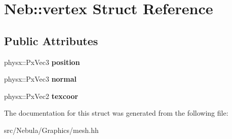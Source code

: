 \hypertarget{structNeb_1_1vertex}{\section{\-Neb\-:\-:vertex \-Struct \-Reference}
\label{structNeb_1_1vertex}
}
\subsection*{\-Public \-Attributes}
\begin{DoxyCompactItemize}
\item 
\hypertarget{structNeb_1_1vertex_a102cf356b8ec3aaa0b97b17d7f9895d2}{physx\-::\-Px\-Vec3 {\bfseries position}}\label{structNeb_1_1vertex_a102cf356b8ec3aaa0b97b17d7f9895d2}

\item 
\hypertarget{structNeb_1_1vertex_a00870a556673b983336f03f46a20c0b2}{physx\-::\-Px\-Vec3 {\bfseries normal}}\label{structNeb_1_1vertex_a00870a556673b983336f03f46a20c0b2}

\item 
\hypertarget{structNeb_1_1vertex_a5bed2aa1a57abd7f0df560e45c4a1802}{physx\-::\-Px\-Vec2 {\bfseries texcoor}}\label{structNeb_1_1vertex_a5bed2aa1a57abd7f0df560e45c4a1802}

\end{DoxyCompactItemize}


\-The documentation for this struct was generated from the following file\-:\begin{DoxyCompactItemize}
\item 
src/\-Nebula/\-Graphics/mesh.\-hh\end{DoxyCompactItemize}

